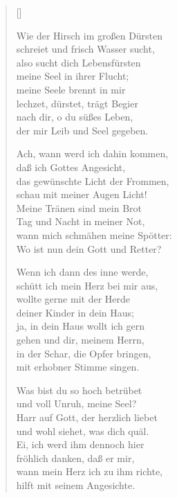 \begin{multicols}{2}
\settowidth{\versewidth}{Wie der Hirsch im großen Dürsten}
\begin{verse}[\versewidth]

 Wie der Hirsch im großen Dürsten\\
schreiet und frisch Wasser sucht,\\
also sucht dich Lebensfürsten\\
meine Seel in ihrer Flucht;\\
meine Seele brennt in mir\\
lechzet, dürstet, trägt Begier\\
nach dir, o du süßes Leben,\\
der mir Leib und Seel gegeben.

 Ach, wann werd ich dahin kommen,\\
daß ich Gottes Angesicht,\\
das gewünschte Licht der Frommen,\\
schau mit meiner Augen Licht!\\
Meine Tränen sind mein Brot\\
Tag und Nacht in meiner Not,\\
wann mich schmähen meine Spötter:\\
Wo ist nun dein Gott und Retter?

 Wenn ich dann des inne werde,\\
schütt ich mein Herz bei mir aus,\\
wollte gerne mit der Herde\\
deiner Kinder in dein Haus;\\
ja, in dein Haus wollt ich gern\\
gehen und dir, meinem Herrn,\\
in der Schar, die Opfer bringen,\\
mit erhobner Stimme singen.

 Was bist du so hoch betrübet\\
und voll Unruh, meine Seel?\\
Harr auf Gott, der herzlich liebet\\
und wohl siehet, was dich quäl.\\
Ei, ich werd ihm dennoch hier\\
fröhlich danken, daß er mir,\\
wann mein Herz ich zu ihm richte,\\
hilft mit seinem Angesichte.


\end{verse}
\end{multicols}
